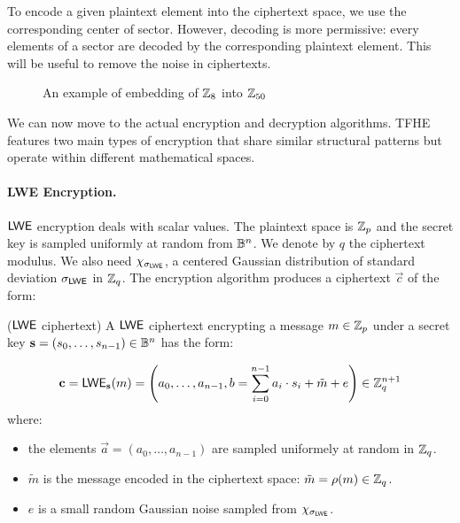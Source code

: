 To encode a given plaintext element into the ciphertext space, we use the corresponding center of sector. However, decoding is more permissive: every elements of a sector are decoded by the corresponding plaintext element. This will be useful to remove the noise in ciphertexts.

\begin{figure}[htbp]
	\centering
	\caption{An example of embedding of $\mathbb{Z}_8$ into $\mathbb{Z}_{50}$}
\end{figure}

We can now move to the actual encryption and decryption algorithms. TFHE features two main types of encryption that share similar structural patterns but operate within different mathematical spaces.

\paragraph{LWE Encryption.}
$\textsf{LWE}$ encryption deals with scalar values. The plaintext space is $\mathbb{Z}_p$ and the secret key is sampled uniformly at random from $\mathbb{B}^n$. We denote by $q$ the ciphertext modulus. We also need 
$\chi_{\sigma_{\textsf{LWE}}}$, a centered Gaussian distribution of standard deviation $\sigma_{\textsf{LWE}}$ in $\mathbb{Z}_q$. The encryption algorithm produces a ciphertext $\vec c$ of the form:

\begin{definition}($\textsf{LWE}$ ciphertext)
	A $\textsf{LWE}$ ciphertext encrypting a message $m \in \mathbb{Z}_p$ under a secret key $\mathbf s=(s_0, \dots, s_{n-1}) \in \mathbb{B}^n$ has the form:
	
	\begin{equation}
		\mathbf c = \textsf{LWE}_{\mathbf s}(m) = \left (a_0, \dots, a_{n-1}, b = \sum_{i=0}^{n-1} a_i \cdot s_i + \tilde m + e \right ) \in \mathbb{Z}_q^{n+1}
	\end{equation}
	where:
	\begin{itemize}
		\item the elements $\vec a = (a_0, \dots, a_{n-1})$ are sampled uniformely at random in $\mathbb{Z}_q$.

		\item $\tilde m$ is the message encoded in the ciphertext space: $\tilde m = \rho(m) \in \mathbb{Z}_q$.
		\item $e$ is a small random Gaussian noise sampled from $\chi_{\sigma_{\textsf{LWE}}}$.
	\end{itemize}
\end{definition}


